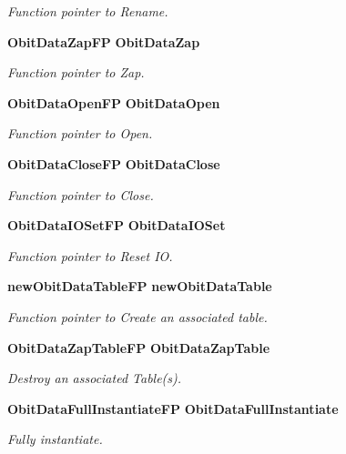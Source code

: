 \begin{CompactItemize}
\begin{CompactList}\small\item\em Function pointer to Rename. \item\end{CompactList}\item 
{\bf Obit\-Data\-Zap\-FP} {\bf Obit\-Data\-Zap}
\begin{CompactList}\small\item\em Function pointer to Zap. \item\end{CompactList}\item 
{\bf Obit\-Data\-Open\-FP} {\bf Obit\-Data\-Open}
\begin{CompactList}\small\item\em Function pointer to Open. \item\end{CompactList}\item 
{\bf Obit\-Data\-Close\-FP} {\bf Obit\-Data\-Close}
\begin{CompactList}\small\item\em Function pointer to Close. \item\end{CompactList}\item 
{\bf Obit\-Data\-IOSet\-FP} {\bf Obit\-Data\-IOSet}
\begin{CompactList}\small\item\em Function pointer to Reset IO. \item\end{CompactList}\item 
{\bf new\-Obit\-Data\-Table\-FP} {\bf new\-Obit\-Data\-Table}
\begin{CompactList}\small\item\em Function pointer to Create an associated table. \item\end{CompactList}\item 
{\bf Obit\-Data\-Zap\-Table\-FP} {\bf Obit\-Data\-Zap\-Table}
\begin{CompactList}\small\item\em Destroy an associated Table(s). \item\end{CompactList}\item 
{\bf Obit\-Data\-Full\-Instantiate\-FP} {\bf Obit\-Data\-Full\-Instantiate}
\begin{CompactList}\small\item\em Fully instantiate. \item\end{CompactList}\item 

\end{CompactItemize}
